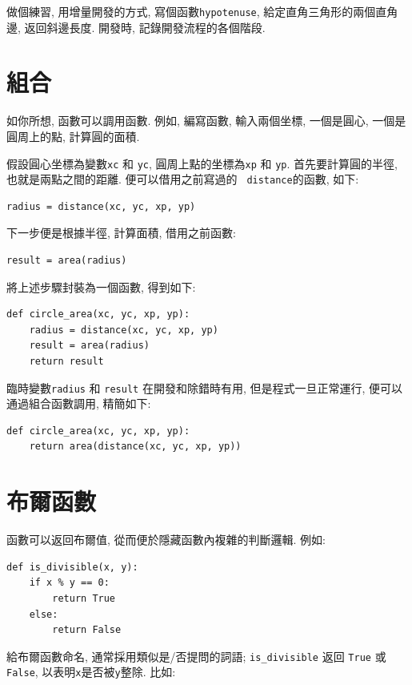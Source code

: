 \documentclass[10pt]{book}
\begin{document}
做個練習, 用增量開發的方式, 寫個函數{\tt hypotenuse}, 
給定直角三角形的兩個直角邊, 返回斜邊長度. 
開發時, 記錄開發流程的各個階段. 



\section{組合}

如你所想, 函數可以調用函數. 
例如, 編寫函數, 輸入兩個坐標, 一個是圓心, 一個是圓周上的點, 
計算圓的面積. 

假設圓心坐標為變數{\tt xc} 和
{\tt yc}, 圓周上點的坐標為{\tt xp} 和 {\tt yp}.
首先要計算圓的半徑, 也就是兩點之間的距離. 
便可以借用之前寫過的 {\tt
distance}的函數, 如下:

\begin{verbatim}
radius = distance(xc, yc, xp, yp)
\end{verbatim}
%
下一步便是根據半徑, 計算面積, 借用之前函數:

\begin{verbatim}
result = area(radius)
\end{verbatim}
%
將上述步驟封裝為一個函數, 得到如下:

\begin{verbatim}
def circle_area(xc, yc, xp, yp):
    radius = distance(xc, yc, xp, yp)
    result = area(radius)
    return result
\end{verbatim}
%
臨時變數{\tt radius} 和 {\tt result} 在開發和除錯時有用, 但是程式一旦正常運行, 
便可以通過組合函數調用, 精簡如下:

\begin{verbatim}
def circle_area(xc, yc, xp, yp):
    return area(distance(xc, yc, xp, yp))
\end{verbatim}
%

\section{布爾函數}
\label{boolean}

函數可以返回布爾值, 從而便於隱藏函數內複雜的判斷邏輯.  
例如:

\begin{verbatim}
def is_divisible(x, y):
    if x % y == 0:
        return True
    else:
        return False
\end{verbatim}
%
給布爾函數命名, 通常採用類似是/否提問的詞語; 
\verb"is_divisible" 返回 {\tt True} 或 {\tt False}, 
以表明{\tt x}是否被{\tt y}整除. 
比如:
\end{document}
